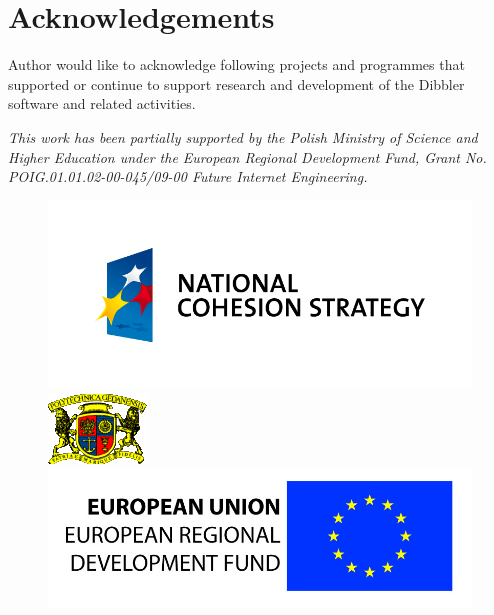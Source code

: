 \newpage
\section{Acknowledgements}
Author would like to acknowledge following projects and programmes
that supported or continue to support research and development of
the Dibbler software and related activities.

\emph{This work has been partially supported by the Polish Ministry of
Science and Higher Education under the European Regional Development
Fund, Grant No. POIG.01.01.02-00-045/09-00 Future Internet Engineering.}

\begin{figure}[ht]
\begin{minipage}[b]{0.33\linewidth}
\centering
\includegraphics[scale=0.45]{logo-nss}
\vspace{-0.8cm}
\end{minipage}
\begin{minipage}[b]{0.33\linewidth}
\centering
\includegraphics[scale=0.7]{logo-pg}
\end{minipage}
\hspace{0.5cm}
\begin{minipage}[b]{0.33\linewidth}
\centering
\includegraphics[scale=0.8]{logo-eu}
\end{minipage}
\end{figure}
\newpage
